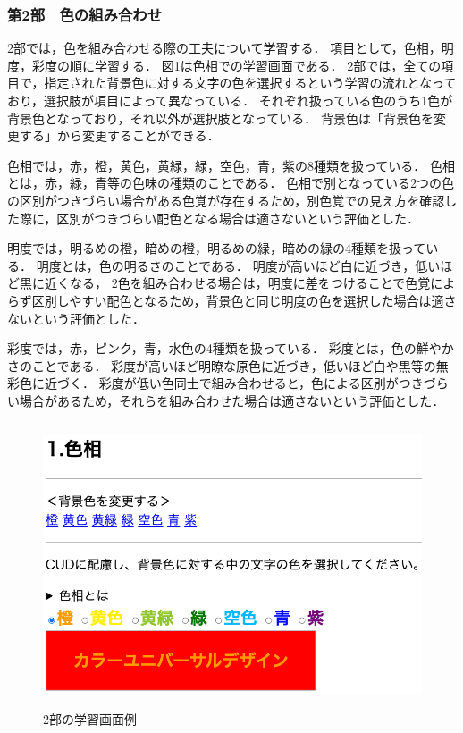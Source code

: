 \clearpage
\subsubsection{第2部　色の組み合わせ}
2部では，色を組み合わせる際の工夫について学習する．
項目として，色相，明度，彩度の順に学習する．
図\ref{fig:gamen_2bu}は色相での学習画面である．
2部では，全ての項目で，指定された背景色に対する文字の色を選択するという学習の流れとなっており，選択肢が項目によって異なっている．
それぞれ扱っている色のうち1色が背景色となっており，それ以外が選択肢となっている．
背景色は「背景色を変更する」から変更することができる．

色相では，赤，橙，黄色，黄緑，緑，空色，青，紫の8種類を扱っている．
色相とは，赤，緑，青等の色味の種類のことである．
色相で別となっている2つの色の区別がつきづらい場合がある色覚が存在するため，別色覚での見え方を確認した際に，区別がつきづらい配色となる場合は適さないという評価とした．

明度では，明るめの橙，暗めの橙，明るめの緑，暗めの緑の4種類を扱っている．
明度とは，色の明るさのことである．
明度が高いほど白に近づき，低いほど黒に近くなる，
2色を組み合わせる場合は，明度に差をつけることで色覚によらず区別しやすい配色となるため，背景色と同じ明度の色を選択した場合は適さないという評価とした．

彩度では，赤，ピンク，青，水色の4種類を扱っている．
彩度とは，色の鮮やかさのことである．
彩度が高いほど明瞭な原色に近づき，低いほど白や黒等の無彩色に近づく．
彩度が低い色同士で組み合わせると，色による区別がつきづらい場合があるため，それらを組み合わせた場合は適さないという評価とした．

\begin{figure}[h]
\begin{center}
 \includegraphics[clip,width=122mm,height=84mm]{images/gamen_2bu.png}
\end{center}
 \caption{2部の学習画面例}
 \label{fig:gamen_2bu}
\end{figure}



